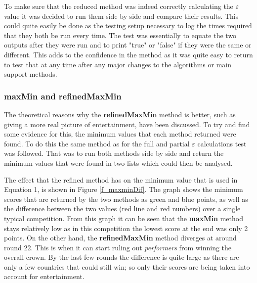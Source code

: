\documentclass[12pt]{report}
\begin{document}
To make sure that the reduced method was indeed correctly calculating the $\varepsilon$ value it was decided to run them side by side and compare their results. This could quite easily be done as the testing setup necessary to log the times required that they both be run every time. The test was essentially to equate the two outputs after they were run and to print "true" or "false" if they were the same or different. This adds to the confidence in the method as it was quite easy to return to test that at any time after any major changes to the algorithms or main support methods.

\subsubsection{maxMin and refinedMaxMin}
The theoretical reasons why the \textbf{refinedMaxMin} method is better, such as giving a more real picture of entertainment, have been discussed. To try and find some evidence for this, the  minimum values that each method returned were found. To do this the same method as for the full and partial $\varepsilon$ calculations test was followed. That was to run both methods side by side and return the minimum values that were found in two lists which could then be analysed.

The effect that the refined method has on the minimum value that is used in Equation 1, is shown in Figure \ref{f_maxminDif}. The graph shows the minimum scores that are returned by the two methods as green and blue points, as well as the difference between the two values (red line and red numbers) over a single typical competition. From this graph it can be seen that the \textbf{maxMin} method stays relatively low as in this competition the lowest score at the end was only 2 points. On the other hand, the \textbf{refinedMaxMin} method diverges at around round 22. This is when it can start ruling out \textit{performers} from winning the overall crown. By the last few rounds the difference is quite large as there are only a few countries that could still win; so only their scores are being taken into account for entertainment.
\end{document}
